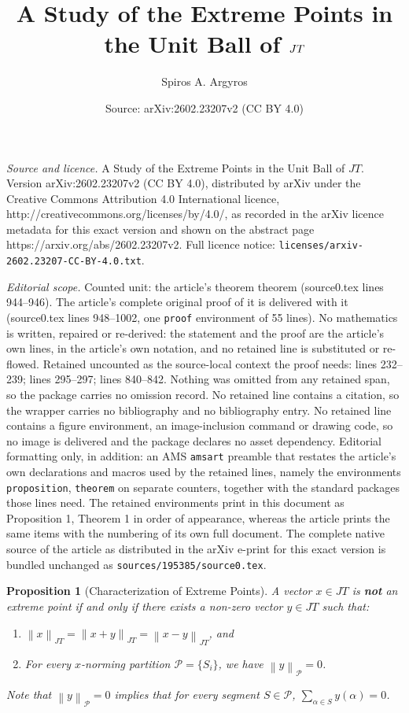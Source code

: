 \documentclass[10pt,a4paper]{amsart}
\title{A Study of the Extreme Points in the Unit Ball of $\JT$}
\author{Spiros A. Argyros}
\date{Source: arXiv:2602.23207v2 (CC BY 4.0)}
\newtheorem{proposition}{Proposition}
\newcommand{\JT}{JT}
\newcommand{\norm}[1]{\left\lVert#1\right\rVert}
\begin{document}
\maketitle

\noindent\emph{Source and licence.} A Study of the Extreme Points in the Unit Ball of $\JT$. Version arXiv:2602.23207v2 (CC BY 4.0), distributed by arXiv under the Creative Commons Attribution 4.0 International licence, http://creativecommons.org/licenses/by/4.0/, as recorded in the arXiv licence metadata for this exact version and shown on the abstract page https://arxiv.org/abs/2602.23207v2. Full licence notice: \texttt{licenses/arxiv-2602.23207-CC-BY-4.0.txt}.\par\smallskip

\noindent\textit{Editorial scope.} Counted unit: the article's theorem theorem (source0.tex lines 944--946). The article's complete original proof of it is delivered with it (source0.tex lines 948--1002, one \texttt{proof} environment of 55 lines). No mathematics is written, repaired or re-derived: the statement and the proof are the article's own lines, in the article's own notation, and no retained line is substituted or re-flowed.  Retained uncounted as the source-local context the proof needs: lines 232--239; lines 295--297; lines 840--842.  Nothing was omitted from any retained span, so the package carries no omission record.  No retained line contains a citation, so the wrapper carries no bibliography and no bibliography entry.  No retained line contains a figure environment, an image-inclusion command or drawing code, so no image is delivered and the package declares no asset dependency.  Editorial formatting only, in addition: an AMS \texttt{amsart} preamble that restates the article's own declarations and macros used by the retained lines, namely the environments \texttt{proposition}, \texttt{theorem} on separate counters, together with the standard packages those lines need.  The retained environments print in this document as Proposition 1, Theorem 1 in order of appearance, whereas the article prints the same items with the numbering of its own full document.  The complete native source of the article as distributed in the arXiv e-print for this exact version is bundled unchanged as \texttt{sources/195385/source0.tex}.
\begin{proposition}[Characterization of Extreme Points]\label{prop.1}
    A vector $x \in \JT$ is \textbf{not} an extreme point if and only if there exists a non-zero vector $y \in \JT$ such that:
    \begin{enumerate}
        \item $\norm{x}_{\JT} = \norm{x+y}_{\JT} = \norm{x-y}_{\JT}$, and
        \item For every $x$-norming partition $\mathcal{P} = \{S_i\}$, we have $\norm{y}_{\mathcal{P}} = 0$.
    \end{enumerate}
    Note that $\norm{y}_{\mathcal{P}} = 0$ implies that for every segment $S \in \mathcal{P}$, $\sum_{\alpha \in S} y(\alpha) = 0$.
\end{proposition}
\end{document}
